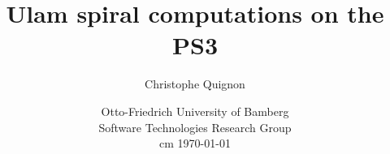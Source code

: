 \documentclass[a4paper]{article}
\begin{document}
\title{%
	Ulam spiral computations on the PS3}
\author{Christophe Quignon}
\date{Otto-Friedrich University of Bamberg\\
Software Technologies Research Group\\
 cm	
\today}

\maketitle


\noindent

\tableofcontents






%
\newpage



   
\end{document}
